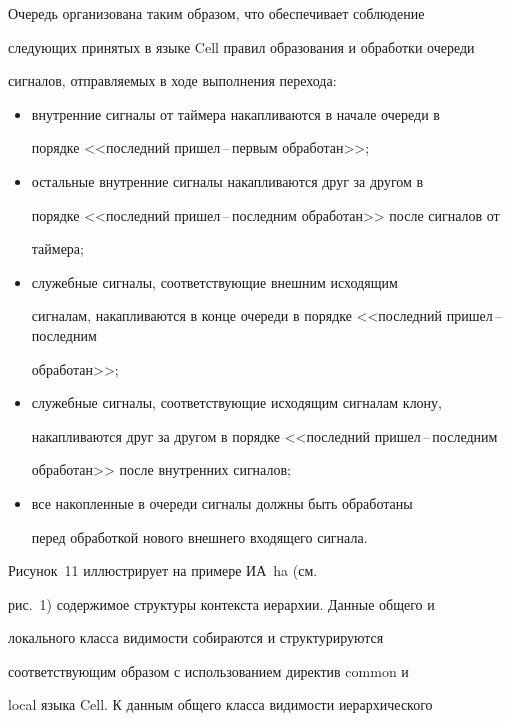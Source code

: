       


      Очередь организована таким образом, что обеспечивает соблюдение 


сле\-ду\-ющих принятых в языке Cell правил образования и обработки очереди 


сигналов, отправляемых в ходе выполнения перехода:


      \begin{itemize}


      \item внутренние сигналы от таймера накапливаются в начале очереди в 


порядке <<последний пришел\,--\,первым обработан>>;


      \item остальные внутренние сигналы накапливаются друг за другом в 


порядке <<последний пришел\,--\,последним обработан>> после сигналов от 


таймера;


      \item служебные сигналы, соответствующие внешним исходящим 


сигналам, накапливаются в конце очереди в порядке <<последний пришел\,--\,по\-след\-ним 


обработан>>;


      \item служебные сигналы, соответствующие исходящим сигналам клону, 


накапливаются друг за другом в порядке <<последний пришел\,--\,последним 


обработан>> после внутренних сигналов;


      \item все накопленные в очереди сигналы должны быть обработаны 


перед обработкой нового внешнего входящего сигнала.


      \end{itemize}


      


      Рисунок~11 иллюстрирует на примере ИА~ha (см.\ 


рис.~1) содержимое структуры контекста иерархии. Данные общего и 


локального класса видимости собираются и структурируются 


соответствующим образом с использованием директив {common} и 


{local} языка Cell. К данным общего класса видимости иерархического 


